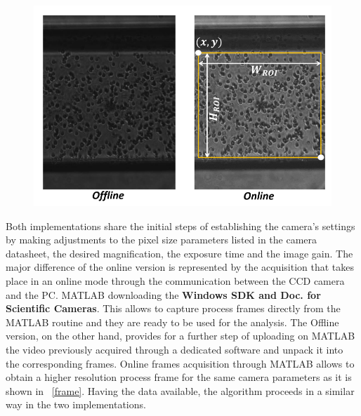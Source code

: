 \documentclass[journal]{IEEEtran}
\theoremstyle{definition}
\theoremstyle{remark}
\begin{document}
\begin{figure}[t]
	\centering
	\includegraphics[width=1\columnwidth]{images/frames}
\end{figure}

Both implementations share the initial steps of establishing the camera's settings by making adjustments to the pixel size parameters listed in the camera datasheet, the desired magnification, the exposure time and the image gain. 
The major difference of the online version is represented by the acquisition that takes place in an online mode through the communication between the CCD camera and the PC.  MATLAB downloading the \textbf{Windows SDK and Doc. for Scientific Cameras}. This allows to capture process frames directly from the MATLAB routine and they are ready to be used for the analysis. The Offline version, on the other hand, provides for a further step of uploading on MATLAB the video previously acquired through a dedicated software and unpack it into the corresponding frames. 
Online frames acquisition through MATLAB allows to obtain a higher resolution process frame for the same camera parameters as it is shown in ~\fig\ref{frame}.
Having the data available, the algorithm proceeds in a similar way in the two implementations. 
\newcommand{\abscissa}{x}
\newcommand{\ordinate}{y}
\newcommand{\mean}[1]{<V_{#1}(t)>}
\newcommand{\spatialmean}[3]{V_{#1}({#2},{#3},t)}
\end{document}
